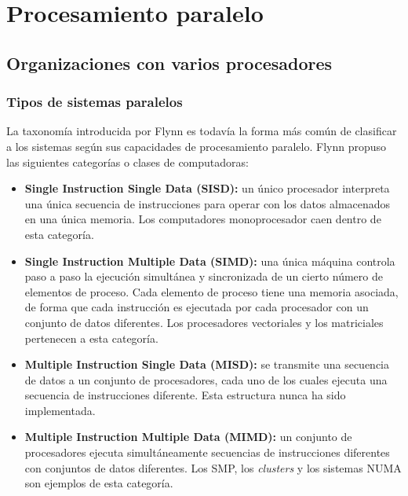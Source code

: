 \section{Procesamiento paralelo}\label{sec:paralel}

\subsection{Organizaciones con varios procesadores}

\subsubsection*{Tipos de sistemas paralelos}

La taxonomía introducida por Flynn es todavía la forma más común de clasificar a los sistemas según sus capacidades de procesamiento paralelo. Flynn propuso las siguientes categorías o clases de computadoras:

\begin{itemize}
  \item \textbf{Single Instruction Single Data (SISD):} un único procesador interpreta una única secuencia de instrucciones para operar con los datos almacenados en una única memoria. Los computadores monoprocesador caen dentro de esta categoría.
  \item \textbf{Single Instruction Multiple Data (SIMD):} una única máquina controla paso a paso la ejecución simultánea y sincronizada de un cierto número de elementos de proceso. Cada elemento de proceso tiene una memoria asociada, de forma que cada instrucción es ejecutada por cada procesador con un conjunto de datos diferentes. Los procesadores vectoriales y los matriciales pertenecen a esta categoría.
  \item \textbf{Multiple Instruction Single Data (MISD):} se transmite una secuencia de datos a un conjunto de procesadores, cada uno de los cuales ejecuta una secuencia de instrucciones diferente. Esta estructura nunca ha sido implementada.
  \item \textbf{Multiple Instruction Multiple Data (MIMD):} un conjunto de procesadores ejecuta simultáneamente secuencias de instrucciones diferentes con conjuntos de datos diferentes. Los SMP, los \textit{clusters} y los sistemas NUMA son ejemplos de esta categoría.
\end{itemize}

